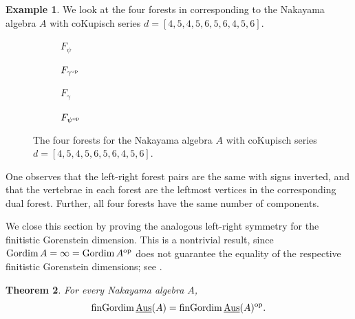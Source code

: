 \documentclass[a4paper]{amsart}
\newtheorem{theorem}{Theorem}[section]
\theoremstyle{definition}
\newtheorem{example}[theorem]{Example}
\theoremstyle{remark}
\numberwithin{equation}{theorem}
\newcommand{\sAus}{\operatorname{\underline{Aus}}}
\newcommand{\gordim}{\operatorname{Gordim}}
\newcommand{\fingordim}{\operatorname{finGordim}}
\newcommand{\psiforest}{F_\psi}
\newcommand{\gammaforest}{F_\gamma}
\newcommand{\op}{\textnormal{op}}
\newcommand{\psiop}{\psi^{\op}}
\newcommand{\gammaop}{\gamma^{\op}}
\newcommand{\psiopforest}{F_{\psiop}}
\newcommand{\gammaopforest}{F_{\gammaop}}
\begin{document}
\begin{example}\label{example:four-forests}
We look at the four forests in  corresponding to the Nakayama algebra $ A $ with coKupisch series $ d = [4,5,4,5,6,5,6,4,5,6] $.
\begin{figure}[t]
  \centering
  \begin{subfigure}[t]{0.48\textwidth}
    \centering
    
    \caption{$\psiforest$}
    \label{fig:coresforest-4545656456}
  \end{subfigure}
  \hfill
  \begin{subfigure}[t]{0.48\textwidth}
    \centering
    
    \caption{$\gammaopforest$}
  \end{subfigure}

  \medskip

  \begin{subfigure}[t]{0.48\textwidth}
    \centering
    
    \caption{$\gammaforest$}
  \end{subfigure}
  \hfill
  \begin{subfigure}[t]{0.48\textwidth}
    \centering
    
    \caption{$\psiopforest$}
  \end{subfigure}
  \caption{The four forests for the Nakayama algebra $ A $ with coKupisch series $ d = [4,5,4,5,6,5,6,4,5,6] $.}
  \label{fig:fourforests-4545656456}
\end{figure}
One observes that the left-right forest pairs are the same with signs inverted, and that the vertebrae in each forest are the leftmost vertices in the corresponding dual forest.
Further, all four forests have the same number of components.
\end{example}

We close this section by proving the analogous left-right symmetry for the finitistic Gorenstein dimension. This is a nontrivial result, since $ \gordim A = \infty = \gordim A^\op $ does not guarantee the equality of the respective finitistic Gorenstein dimensions; see .

\begin{theorem}\label{fingordim.symmetry}
    For every Nakayama algebra $ A $,
        \[
            \fingordim \sAus(A) = \fingordim \sAus(A)^\op   .
        \]
\end{theorem}
\end{document}
